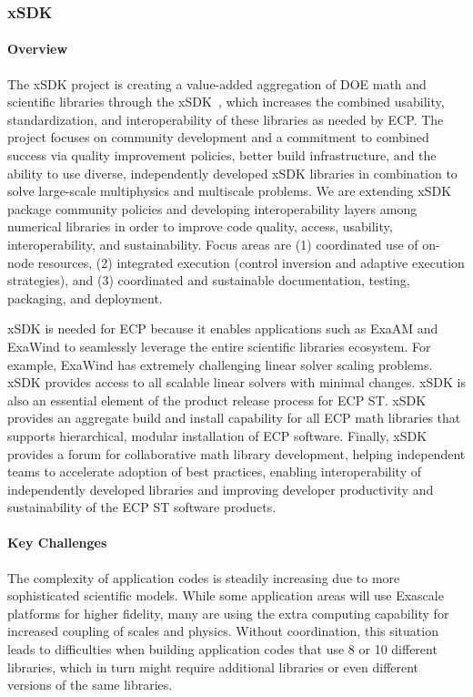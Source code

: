 \subsubsection{ xSDK} 
\paragraph{Overview} The xSDK project is creating a value-added aggregation of DOE math and scientific libraries through the xSDK~\cite{xsdk:homepage}, which increases the combined usability, standardization, and interoperability of these libraries as needed by ECP. The project focuses on community development and a commitment to combined success via quality improvement policies, better build infrastructure, and the ability to use diverse, independently developed xSDK libraries in combination to solve large-scale multiphysics and multiscale problems.  We are extending xSDK package community policies and developing interoperability layers among numerical libraries in order to improve code quality, access, usability, interoperability, and sustainability. Focus areas are (1) coordinated use of on-node resources, (2) integrated execution (control inversion and adaptive execution strategies), and (3) coordinated and sustainable documentation, testing, packaging, and deployment. %

xSDK is needed for ECP because it enables applications such as ExaAM and ExaWind to seamlessly leverage the entire scientific libraries ecosystem.  For example, ExaWind has extremely challenging linear solver scaling problems.  xSDK provides access to all scalable linear solvers with minimal changes.  xSDK is also an essential element of the product release process for ECP ST.  xSDK provides an aggregate build and install capability for all ECP math libraries that supports hierarchical, modular installation of ECP software.  Finally, xSDK provides a forum for collaborative math library development, helping independent teams to accelerate adoption of best practices, enabling interoperability of independently developed libraries and improving developer productivity and sustainability of the ECP ST software products.

\paragraph{Key Challenges}
The complexity of application codes is steadily increasing due to more sophisticated scientific models.  While some application areas will use Exascale platforms for higher fidelity, many are using the extra computing capability for increased coupling of scales and physics.  Without coordination, this situation  leads to difficulties when building application codes that use 8 or 10 different libraries, which in turn might require additional libraries or even different versions of the same libraries.


